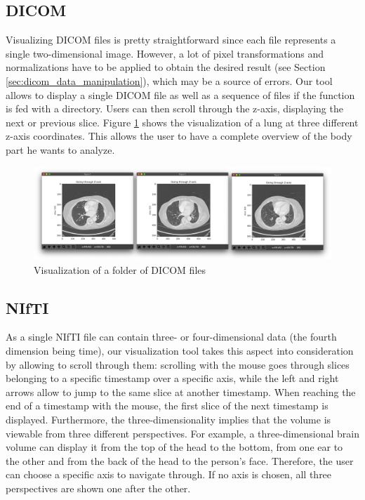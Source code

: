 \subsection{DICOM}
\setlength{\marginparwidth}{3cm}\leavevmode {}Visualizing DICOM files is pretty straightforward since each file represents a single two-dimensional image. However, a lot of pixel transformations and normalizations have to be applied to obtain the desired result (see Section \ref{sec:dicom_data_manipulation}), which may be a source of errors. Our tool allows to display a single DICOM file as well as a sequence of files if the function is fed with a directory. Users can then scroll through the z-axis, displaying the next or previous slice.  Figure \ref{fig:visualize_lung_dcm} shows the visualization of a lung at three different z-axis coordinates. This allows the user to have a complete overview of the body part he wants to analyze.

\begin{figure}[!h]
\centering
\includegraphics[width=\textwidth, keepaspectratio=true]{./figures/visualize_lung_dcm.png}
\caption{Visualization of a folder of DICOM files}
\label{fig:visualize_lung_dcm}
\end{figure}


\subsection{NIfTI}
\setlength{\marginparwidth}{3cm}\leavevmode {}As a single NIfTI file can contain three- or four-dimensional data (the fourth dimension being time), our visualization tool takes this aspect into consideration by allowing to scroll through them: scrolling with the mouse goes through slices belonging to a specific timestamp over a specific axis, while the left and right arrows allow to jump to the same slice at another timestamp. When reaching the end of a timestamp with the mouse, the first slice of the next timestamp is displayed. Furthermore, the three-dimensionality implies that the volume is viewable from three different perspectives. For example, a three-dimensional brain volume can display it from the top of the head to the bottom, from one ear to the other and from the back of the head to the person's face. Therefore, the user can choose a specific axis to navigate through. If no axis is chosen, all three perspectives are shown one after the other.

